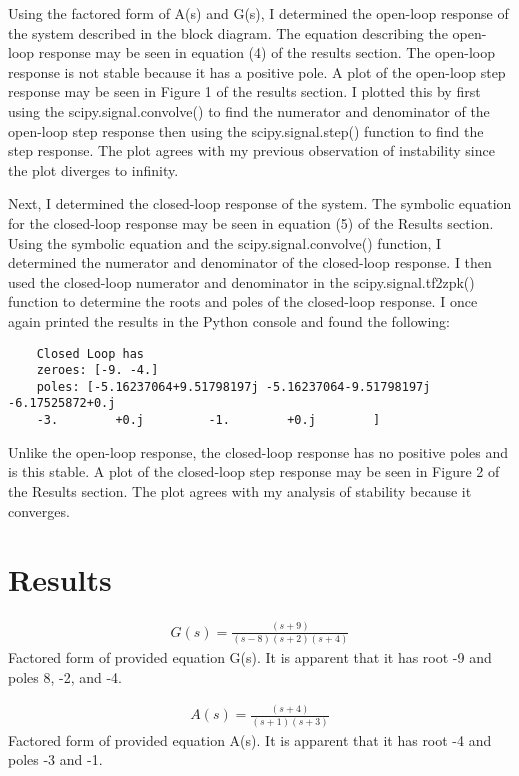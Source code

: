 \documentclass[12pt]{article}
\begin{document}
    \par Using the factored form of A(s) and G(s), I determined the open-loop response of the system described in the block diagram. The equation describing the open-loop response may be seen in equation (4) of the results section. The open-loop response is not stable because it has a positive pole. A plot of the open-loop step response may be seen in Figure 1 of the results section. I plotted this by first using the scipy.signal.convolve() to find the numerator and denominator of the open-loop step response then using the scipy.signal.step() function to find the step response. The plot agrees with my previous observation of instability since the plot diverges to infinity.
    \par Next, I determined the closed-loop response of the system. The symbolic equation for the closed-loop response may be seen in equation (5) of the Results section. Using the symbolic equation and the scipy.signal.convolve() function, I determined the numerator and denominator of the closed-loop response. I then used the closed-loop numerator and denominator in the scipy.signal.tf2zpk() function to determine the roots and poles of the closed-loop response. I once again printed the results in the Python console and found the following: 
    \begin{verbatim}
    Closed Loop has 
    zeroes: [-9. -4.]
    poles: [-5.16237064+9.51798197j -5.16237064-9.51798197j -6.17525872+0.j
    -3.        +0.j         -1.        +0.j        ]
    \end{verbatim}
    Unlike the open-loop response, the closed-loop response has no positive poles and is this stable. A plot of the closed-loop step response may be seen in Figure 2 of the Results section. The plot agrees with my analysis of stability because it converges.
    
\newpage
\section{Results}
\begin{equation}
\begin{split}
G(s) = \frac{(s+9)}{(s-8)(s+2)(s+4)}
\end{split}
\end{equation}
Factored form of provided equation G(s). It is apparent that it has root -9 and poles 8, -2, and -4.

\begin{equation}
\begin{split}
A(s) = \frac{(s+4)}{(s+1)(s+3)}
\end{split}
\end{equation}
Factored form of provided equation A(s). It is apparent that it has root -4 and poles -3 and -1.
\end{document}
